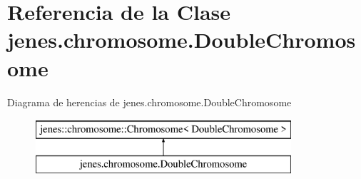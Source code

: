 \hypertarget{classjenes_1_1chromosome_1_1_double_chromosome}{\section{Referencia de la Clase jenes.\-chromosome.\-Double\-Chromosome}
\label{classjenes_1_1chromosome_1_1_double_chromosome}
}
Diagrama de herencias de jenes.\-chromosome.\-Double\-Chromosome\begin{figure}[H]
\begin{center}
\leavevmode
\includegraphics[height=2.000000cm]{classjenes_1_1chromosome_1_1_double_chromosome}
\end{center}
\end{figure}
